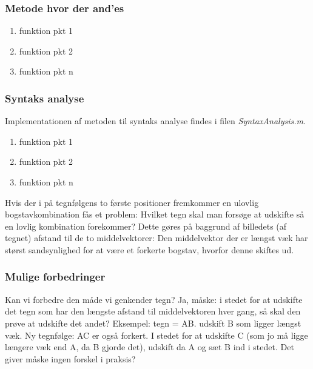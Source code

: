 \subsubsection{Metode hvor der and'es}

\begin{enumerate}
\item funktion pkt 1
\item funktion pkt 2
\item funktion pkt n
\end{enumerate}

\subsubsection{Syntaks analyse}

Implementationen af metoden til syntaks analyse findes i filen \textit{SyntaxAnalysis.m}.

\begin{enumerate}
\item funktion pkt 1
\item funktion pkt 2
\item funktion pkt n
\end{enumerate}

Hvis der i på tegnfølgens to første positioner fremkommer en ulovlig bogstavkombination fås et problem: Hvilket tegn skal man forsøge at udskifte så en lovlig kombination forekommer? Dette gøres på baggrund af billedets (af tegnet) afstand til de to middelvektorer: Den middelvektor der er længst væk har størst sandsynlighed for at være et forkerte bogstav, hvorfor denne skiftes ud.

\subsubsection{Mulige forbedringer}
Kan vi forbedre den måde vi genkender tegn? Ja, måske: i stedet for at udskifte det tegn som har den længste afstand til middelvektoren hver gang, så skal den prøve at udskifte det andet? Eksempel: tegn = AB. udskift B som ligger længst væk. Ny tegnfølge: AC er også forkert. I stedet for at udskifte C (som jo må ligge længere væk end A, da B gjorde det), udskift da A og sæt B ind i stedet. Det giver måske ingen forskel i praksis?